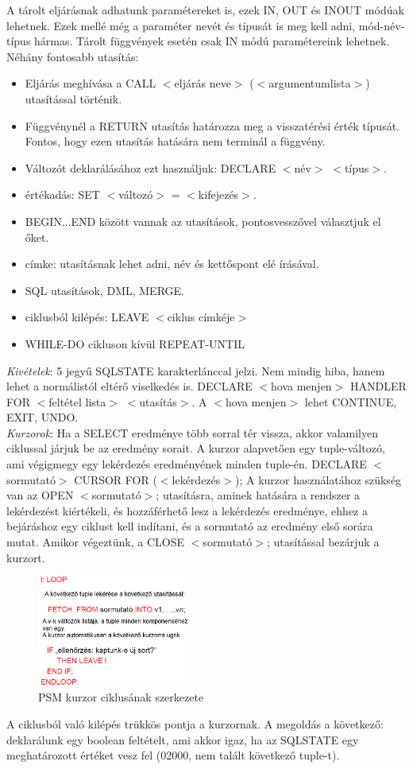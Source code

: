 \documentclass[margin=0px]{article}
\begin{document}
A tárolt eljárásnak adhatunk paramétereket is, ezek IN, OUT és INOUT módúak lehetnek. Ezek mellé még a paraméter nevét és típusát is meg kell adni, mód-név-típus hármas. Tárolt függvények esetén csak IN módú paramétereink lehetnek. \\
Néhány fontosabb utasítás:
\begin{itemize}
    \item Eljárás meghívása a CALL $<$eljárás neve$>$ ($<$argumentumlista$>$) utasítással történik.
    \item Függvénynél a RETURN utasítás határozza meg a visszatérési érték típusát. Fontos, hogy ezen utasítás hatására nem terminál a függvény.
    \item Változót deklarálásához ezt használjuk: DECLARE $<$név$>$ $<$típus$>$.
    \item értékadás: SET $<$változó$>$ = $<$kifejezés$>$.
    \item BEGIN...END között vannak az utasítások, pontosvesszővel választjuk el őket.
    \item címke: utasításnak lehet adni, név és kettőspont elé írásával.
    \item SQL utasítások, DML, MERGE.
    \item ciklusból kilépés: LEAVE $<$ciklus címkéje$>$
    \item WHILE-DO cikluson kívül REPEAT-UNTIL
\end{itemize}
\textit{Kivételek}: 5 jegyű SQLSTATE karakterlánccal jelzi. Nem mindig hiba, hanem lehet a normálistól eltérő viselkedés is. DECLARE $<$hova menjen$>$ HANDLER FOR $<$feltétel lista$>$ $<$utasítás$>$. A $<$hova menjen$>$ lehet CONTINUE, EXIT, UNDO. \\
\textit{Kurzorok}: Ha a SELECT eredménye több sorral tér vissza, akkor valamilyen ciklussal járjuk be az eredmény sorait. A kurzor alapvetően egy tuple-változó, ami végigmegy egy lekérdezés eredményének minden tuple-én. DECLARE $<$sormutató$>$ CURSOR FOR ($<$lekérdezés$>$); A kurzor használatához szükség van az OPEN $<$sormutató$>$; utasításra, aminek hatására a rendszer a lekérdezést kiértékeli, és hozzáférhető lesz a lekérdezés eredménye, ehhez a bejáráshoz egy ciklust kell indítani, és a sormutató az eredmény első sorára mutat. Amikor végeztünk, a CLOSE $<$sormutató$>$; utasítással bezárjuk a kurzort.
\begin{figure}[H]
    \centering
    \includegraphics[width=0.45\textwidth]{img/psm3.png}
    \caption{PSM kurzor ciklusának szerkezete}
\end{figure}
A ciklusból való kilépés trükkös pontja a kurzornak. A megoldás a következő: deklarálunk egy boolean feltételt, ami akkor igaz, ha az SQLSTATE egy meghatározott értéket vesz fel (02000, nem talált következő tuple-t).
\end{document}
